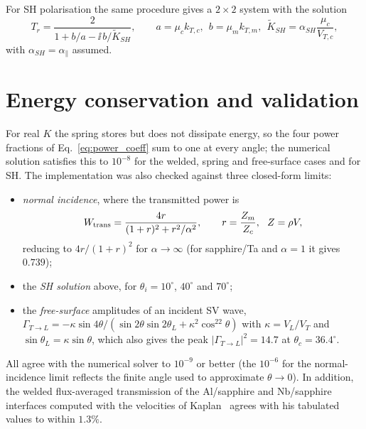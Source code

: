 For SH polarisation the same procedure gives a $2\times2$ system with the solution
\begin{equation}
  T_r=\frac{2}{1+b/a-\ii\,b/\tilde K_{SH}},\qquad a=\mu_ck_{T,c},\ \ b=\mu_mk_{T,m},\ \
  \tilde K_{SH}=\alpha_{SH}\frac{\mu_c}{V_{T,c}},
\end{equation}
with $\alpha_{SH}=\alpha_\parallel$ assumed.

\section{Energy conservation and validation}

For real $K$ the spring stores but does not dissipate energy, so the four power fractions of
Eq.~\eqref{eq:power_coeff} sum to one at every angle; the numerical solution satisfies this to
$10^{-8}$ for the welded, spring and free-surface cases and for SH. The implementation was
also checked against three closed-form limits:
\begin{itemize}
\item \emph{normal incidence}, where the transmitted power is
\begin{equation}
  W_{\rm trans}=\frac{4r}{(1+r)^2+r^2/\alpha^2},\qquad r=\frac{Z_m}{Z_c},\ \ Z=\rho V,
  \label{eq:normal_spring}
\end{equation}
reducing to $4r/(1+r)^2$ for $\alpha\to\infty$ (for sapphire/Ta and $\alpha=1$ it gives $0.739$);
\item the \emph{SH solution} above, for $\theta_i=10^\circ$, $40^\circ$ and $70^\circ$;
\item the \emph{free-surface} amplitudes of an incident SV wave,
$\Gamma_{T\to L}=-\kappa\sin4\theta/(\sin2\theta\sin2\theta_L+\kappa^2\cos^22\theta)$ with
$\kappa=V_L/V_T$ and $\sin\theta_L=\kappa\sin\theta$, which also gives the peak
$|\Gamma_{T\to L}|^2=14.7$ at $\theta_c=36.4^\circ$.
\end{itemize}
All agree with the numerical solver to $10^{-9}$ or better (the $10^{-6}$ for the
normal-incidence limit reflects the finite angle used to approximate $\theta\to0$). In addition, the welded flux-averaged
transmission of the Al/sapphire and Nb/sapphire interfaces computed with the velocities of Kaplan~\cite{Kaplan1979}
agrees with his tabulated values to within $1.3\%$.
